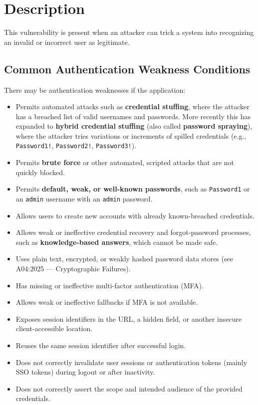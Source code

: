 \documentclass[11pt]{article}
\begin{document}
\section{Description}
This vulnerability is present when an attacker can trick a system into recognizing an invalid or incorrect user as legitimate.

\subsection{Common Authentication Weakness Conditions}
There may be authentication weaknesses if the application:

\begin{itemize}
  \item Permits automated attacks such as \textbf{credential stuffing}, where the attacker has a breached list of valid usernames and passwords. More recently this has expanded to \textbf{hybrid credential stuffing} (also called \textbf{password spraying}), where the attacker tries variations or increments of spilled credentials (e.g., \texttt{Password1!}, \texttt{Password2!}, \texttt{Password3!}).
  \item Permits \textbf{brute force} or other automated, scripted attacks that are not quickly blocked.
  \item Permits \textbf{default, weak, or well-known passwords}, such as \texttt{Password1} or an \texttt{admin} username with an \texttt{admin} password.
  \item Allows users to create new accounts with already known-breached credentials.
  \item Allows weak or ineffective credential recovery and forgot-password processes, such as \textbf{knowledge-based answers}, which cannot be made safe.
  \item Uses plain text, encrypted, or weakly hashed password data stores (see A04:2025 --- Cryptographic Failures).
  \item Has missing or ineffective multi-factor authentication (MFA).
  \item Allows weak or ineffective fallbacks if MFA is not available.
  \item Exposes session identifiers in the URL, a hidden field, or another insecure client-accessible location.
  \item Reuses the same session identifier after successful login.
  \item Does not correctly invalidate user sessions or authentication tokens (mainly SSO tokens) during logout or after inactivity.
  \item Does not correctly assert the scope and intended audience of the provided credentials.
\end{itemize}
\end{document}
